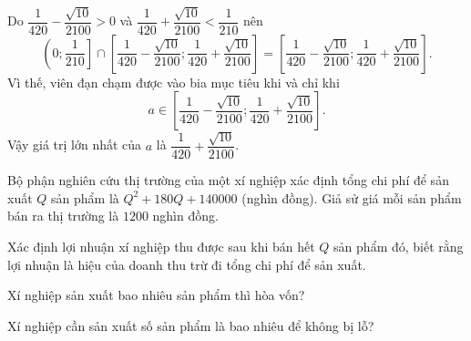 \begin{vd}
{
	Do $->0$ và $+<$ nên
	\[\left(0;\dfrac{1}{210}\right]\cap\left[\dfrac{1}{420}-\dfrac{\sqrt{10}}{2100};\dfrac{1}{420}+\dfrac{\sqrt{10}}{2100}\right]=\left[\dfrac{1}{420}-\dfrac{\sqrt{10}}{2100};\dfrac{1}{420}+\dfrac{\sqrt{10}}{2100}\right].\]
	Vì thế, viên đạn chạm được vào bia mục tiêu khi và chỉ khi
	\[a\in\left[\dfrac{1}{420}-\dfrac{\sqrt{10}}{2100};\dfrac{1}{420}+\dfrac{\sqrt{10}}{2100}\right].\]
	Vậy giá trị lớn nhất của $a$ là $+$.
	}
\end{vd}
\baitaptl
\begin{bt}%
	Bộ phận nghiên cứu thị trường của một xí nghiệp xác định tổng chi phí để sản xuất $Q$ sản phẩm là $Q^2+180Q+140000$ (nghìn đồng). Giả sử giá mỗi sản phẩm bán ra thị trường là $1200$ nghìn đồng.
	\begin{enumEX}{1}
	\item Xác định lợi nhuận xí nghiệp thu được sau khi bán hết $Q$ sản phẩm đó, biết rằng lợi nhuận là hiệu của doanh thu trừ đi tổng chi phí để sản xuất.
	\item Xí nghiệp sản xuất bao nhiêu sản phẩm thì hòa vốn?
	\item Xí nghiệp cần sản xuất số sản phẩm là bao nhiêu để không bị lỗ?
	\end{enumEX}
\end{bt}
